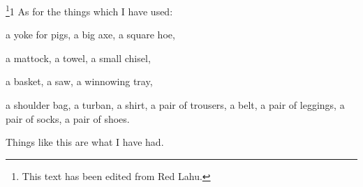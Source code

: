 \setcounter{footnote}{0}

\footnote{This text has been edited from Red Lahu.}1 As for the things which I have used:

a yoke for pigs, a big axe, a square hoe,

a mattock, a towel, a small chisel,

a basket, a saw, a winnowing tray,

a shoulder bag, a turban, a shirt, a pair of trousers, a belt, a pair of leggings,
a pair of socks, a pair of shoes.

Things like this are what I have had.


